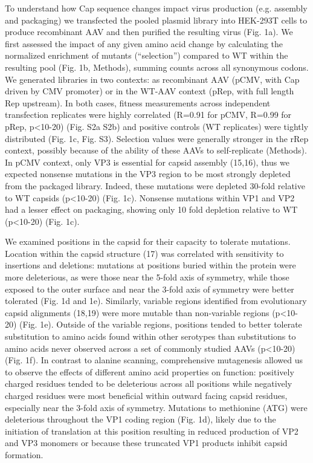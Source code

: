 To understand how Cap sequence changes impact virus production (e.g. assembly and packaging) we transfected the pooled plasmid library into HEK-293T cells to produce recombinant AAV and then purified the resulting virus (Fig. 1a). We first assessed the impact of any given amino acid change by calculating the normalized enrichment of mutants (“selection”) compared to WT within the resulting pool (Fig. 1b, Methods), summing counts across all synonymous codons. We generated libraries in two contexts: as recombinant AAV (pCMV, with Cap driven by CMV promoter) or in the WT-AAV context (pRep, with full length Rep upstream). In both cases, fitness measurements across independent transfection replicates were highly correlated (R=0.91 for pCMV, R=0.99 for pRep, p<10-20) (Fig. S2a S2b) and positive controls (WT replicates) were tightly distributed (Fig. 1c, Fig. S3). Selection values were generally stronger in the rRep context, possibly because of the ability of these AAVs to self-replicate (Methods). In pCMV context, only VP3 is essential for capsid assembly (15,16), thus we expected nonsense mutations in the VP3 region to be most strongly depleted from the packaged library. Indeed, these mutations were depleted 30-fold relative to WT capsids (p<10-20) (Fig. 1c). Nonsense mutations within VP1 and VP2 had a lesser effect on packaging, showing only 10 fold depletion relative to WT (p<10-20) (Fig. 1c). 

We examined positions in the capsid for their capacity to tolerate mutations. Location within the capsid structure (17) was correlated with sensitivity to insertions and deletions: mutations at positions buried within the protein were more deleterious, as were those near the 5-fold axis of symmetry, while those exposed to the outer surface and near the 3-fold axis of symmetry were better tolerated (Fig. 1d and 1e). Similarly, variable regions identified from evolutionary capsid alignments (18,19) were more mutable than non-variable regions (p<10-20) (Fig. 1e). Outside of the variable regions, positions tended to better tolerate substitution to amino acids found within other serotypes than substitutions to amino acids never observed across a set of commonly studied AAVs (p<10-20) (Fig. 1f). In contrast to alanine scanning, comprehensive mutagenesis allowed us to observe the effects of different amino acid properties on function: positively charged residues tended to be deleterious across all positions while negatively charged residues were most beneficial within outward facing capsid residues, especially near the 3-fold axis of symmetry. Mutations to methionine (ATG) were deleterious throughout the VP1 coding region (Fig. 1d), likely due to the initiation of translation at this position resulting in reduced production of VP2 and VP3 monomers or because these truncated VP1 products inhibit capsid formation. 

